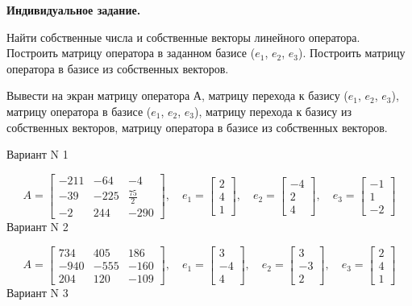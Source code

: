 \documentclass[11pt]{report}
\begin{document}
\pagestyle{empty}

{\bf Индивидуальное задание.}


Найти собственные числа и собственные векторы линейного оператора. 
Построить матрицу оператора в заданном базисе ($e_1$, $e_2$, $e_3$). 
Построить матрицу оператора в базисе из собственных векторов.

Вывести на экран матрицу оператора А, матрицу перехода к базису ($e_1$, $e_2$, $e_3$), 
матрицу оператора в базисе ($e_1$, $e_2$, $e_3$), матрицу перехода к базису из собственных векторов, 
матрицу оператора в базисе из собственных векторов.

Вариант N 1

$$A = \left[\begin{matrix}-211 & -64 & -4\\-39 & -225 & \frac{75}{2}\\-2 & 244 & -290\end{matrix}\right],\quad e_1 = \left[\begin{matrix}2\\4\\1\end{matrix}\right],\quad e_2 = \left[\begin{matrix}-4\\2\\4\end{matrix}\right],\quad e_3 = \left[\begin{matrix}-1\\1\\-2\end{matrix}\right]$$Вариант N 2

$$A = \left[\begin{matrix}734 & 405 & 186\\-940 & -555 & -160\\204 & 120 & -109\end{matrix}\right],\quad e_1 = \left[\begin{matrix}3\\-4\\4\end{matrix}\right],\quad e_2 = \left[\begin{matrix}3\\-3\\2\end{matrix}\right],\quad e_3 = \left[\begin{matrix}2\\4\\1\end{matrix}\right]$$Вариант N 3
\end{document}
